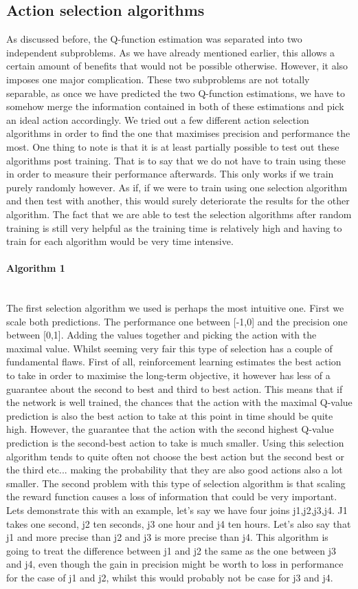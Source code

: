 \subsection{Action selection algorithms}
As discussed before, the Q-function estimation was separated into two independent subproblems. As we have already mentioned earlier, this allows a certain amount of benefits that would not be possible otherwise. However, it also imposes one major complication. These two subproblems are not totally separable, as once we have predicted the two Q-function estimations, we have to somehow merge the information contained in both of these estimations and pick an ideal action accordingly. We tried out a few different action selection algorithms in order to find the one that maximises precision and performance the most. One thing to note is that it is at least partially possible to test out these algorithms post training. That is to say that we do not have to train using these in order to measure their performance afterwards. This only works if we train purely randomly however. As if, if we were to train using one selection algorithm and then test with another, this would surely deteriorate the results for the other algorithm. The fact that we are able to test the selection algorithms after random training is still very helpful as the training time is relatively high and having to train for each algorithm would be very time intensive.
\paragraph{Algorithm 1}\mbox{}\\
The first selection algorithm we used is perhaps the most intuitive one. First we scale both predictions. The performance one between [-1,0] and the precision one between [0,1]. Adding the values together and picking the action with the maximal value. Whilst seeming very fair this type of selection has a couple of fundamental flaws. First of all, reinforcement learning estimates the best action to take in order to maximise the long-term objective, it however has less of a guarantee about the second to best and third to best action. This means that if the network is well trained, the chances that the action with the maximal Q-value prediction is also the best action to take at this point in time should be quite high. However, the guarantee that the action with the second highest Q-value prediction is the second-best action to take is much smaller. Using this selection algorithm tends to quite often not choose the best action but the second best or the third etc... making the probability that they are also good actions also a lot smaller. The second problem with this type of selection algorithm is that scaling the reward function causes a loss of information that could be very important. Lets demonstrate this with an example, let's say we have four joins j1,j2,j3,j4. J1 takes one second, j2 ten seconds, j3 one hour and j4 ten hours. Let's also say that j1 and more precise than j2 and j3 is more precise than j4. This algorithm is going to treat the difference between j1 and j2 the same as the one between j3 and j4, even though the gain in precision might be worth to loss in performance for the case of j1 and j2, whilst this would probably not be case for j3 and j4.

